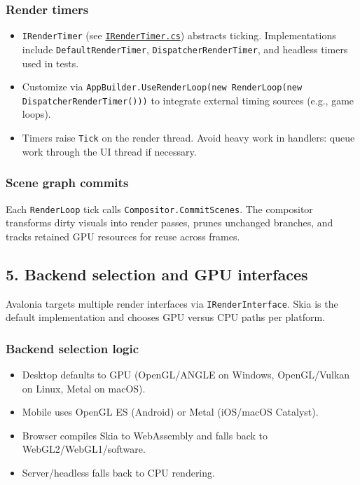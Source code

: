\subsubsection{Render timers}\label{render-timers}

\begin{itemize}
\tightlist
\item
  \passthrough{\lstinline!IRenderTimer!} (see
  \href{https://github.com/AvaloniaUI/Avalonia/blob/master/src/Avalonia.Base/Rendering/IRenderTimer.cs}{\passthrough{\lstinline!IRenderTimer.cs!}})
  abstracts ticking. Implementations include
  \passthrough{\lstinline!DefaultRenderTimer!},
  \passthrough{\lstinline!DispatcherRenderTimer!}, and headless timers
  used in tests.
\item
  Customize via
  \passthrough{\lstinline!AppBuilder.UseRenderLoop(new RenderLoop(new DispatcherRenderTimer()))!}
  to integrate external timing sources (e.g., game loops).
\item
  Timers raise \passthrough{\lstinline!Tick!} on the render thread.
  Avoid heavy work in handlers: queue work through the UI thread if
  necessary.
\end{itemize}

\subsubsection{Scene graph commits}\label{scene-graph-commits}

Each \passthrough{\lstinline!RenderLoop!} tick calls
\passthrough{\lstinline!Compositor.CommitScenes!}. The compositor
transforms dirty visuals into render passes, prunes unchanged branches,
and tracks retained GPU resources for reuse across frames.

\subsection{5. Backend selection and GPU
interfaces}\label{backend-selection-and-gpu-interfaces}

Avalonia targets multiple render interfaces via
\passthrough{\lstinline!IRenderInterface!}. Skia is the default
implementation and chooses GPU versus CPU paths per platform.

\subsubsection{Backend selection logic}\label{backend-selection-logic}

\begin{itemize}
\tightlist
\item
  Desktop defaults to GPU (OpenGL/ANGLE on Windows, OpenGL/Vulkan on
  Linux, Metal on macOS).
\item
  Mobile uses OpenGL ES (Android) or Metal (iOS/macOS Catalyst).
\item
  Browser compiles Skia to WebAssembly and falls back to
  WebGL2/WebGL1/software.
\item
  Server/headless falls back to CPU rendering.
\end{itemize}

